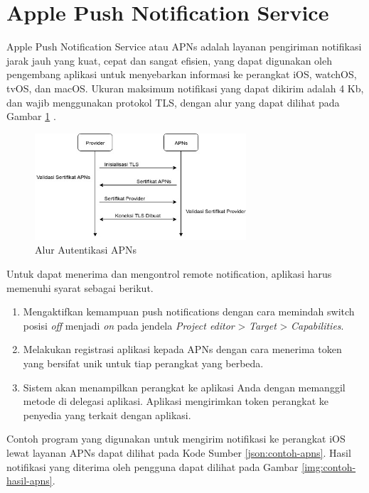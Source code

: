 \section{Apple Push Notification Service}
\par Apple Push Notification Service atau APNs adalah layanan pengiriman notifikasi jarak jauh yang kuat, cepat dan sangat efisien, yang dapat digunakan oleh pengembang aplikasi untuk menyebarkan informasi ke perangkat iOS, watchOS, tvOS, dan macOS. Ukuran maksimum notifikasi yang dapat dikirim adalah 4 Kb, dan wajib menggunakan protokol TLS, dengan alur yang dapat dilihat pada Gambar \ref{img:apns-certificate} \cite{apns-online}.
\begin{figure}[H]
	\centering\includegraphics[width=0.7\textwidth]{bab2/img/activity-apns_certificate_connection.jpg}
	\caption{Alur Autentikasi APNs}
	\label{img:apns-certificate}
\end{figure}
\par Untuk dapat menerima dan mengontrol remote notification, aplikasi harus memenuhi syarat sebagai berikut.
\begin{enumerate}
	\item Mengaktifkan kemampuan push notifications dengan cara memindah switch posisi \textit{off} menjadi \textit{on} pada jendela \textit{Project editor} > \textit{Target} > \textit{Capabilities}.
	\item Melakukan registrasi aplikasi kepada APNs dengan cara menerima token yang bersifat unik untuk tiap perangkat yang berbeda.
	\item Sistem akan menampilkan perangkat ke aplikasi Anda dengan memanggil metode di delegasi aplikasi. Aplikasi mengirimkan token perangkat ke penyedia yang terkait dengan aplikasi.
\end{enumerate}
\par Contoh program yang digunakan untuk mengirim notifikasi ke perangkat iOS lewat layanan APNs dapat dilihat pada Kode Sumber \ref{json:contoh-apns}. Hasil notifikasi yang diterima oleh pengguna dapat dilihat pada Gambar \ref{img:contoh-hasil-apns}.
